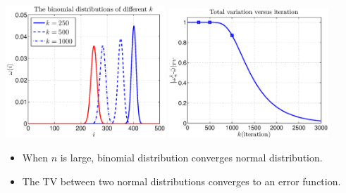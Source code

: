 \documentclass[12pt,t]{beamer}
\begin{document}
\begin{frame}

  \centerline{
   \includegraphics[width=0.45\textwidth]{deltaMexample2a}
         \includegraphics[width=0.45\textwidth]{ehrenfasttv}
  }
  \begin{itemize}
  \item When $n$ is large, binomial distribution converges normal distribution.
  \item The TV between two normal distributions converges to an error function.
  \end{itemize}
\end{frame}
\end{document}
